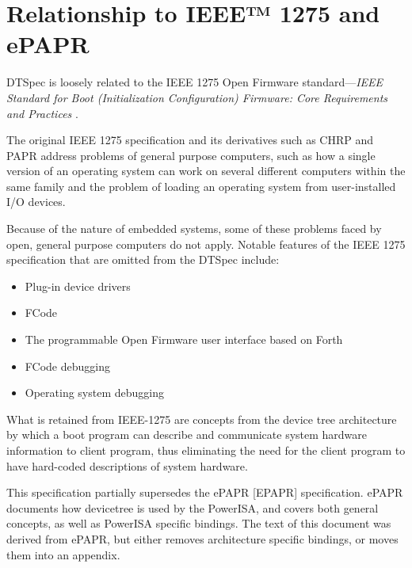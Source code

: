 \documentclass[a4paper,10pt,oneside]{sphinxmanual}
\begin{document}
\section{Relationship to IEEE™ 1275 and ePAPR}
\label{introduction:relationship-to-ieee-1275-and-epapr}
DTSpec is loosely related to the IEEE 1275 Open Firmware
standard—\emph{IEEE Standard for Boot (Initialization Configuration)
Firmware: Core Requirements and Practices} \label{introduction:id1}{\hyperref[references:ieee1275]{\crossref{{[}IEEE1275{]}}}}.

The original IEEE 1275 specification and its derivatives such as CHRP \label{introduction:id2}{\hyperref[references:chrp]{\crossref{{[}CHRP{]}}}}
and PAPR \label{introduction:id3}{\hyperref[references:papr]{\crossref{{[}PAPR{]}}}} address problems of general purpose computers, such as how a
single version of an operating system can work on several different
computers within the same family and the problem of loading an operating
system from user-installed I/O devices.

Because of the nature of embedded systems, some of these problems faced
by open, general purpose computers do not apply. Notable features of the
IEEE 1275 specification that are omitted from the DTSpec include:
\begin{itemize}
\item {} 
Plug-in device drivers

\item {} 
FCode

\item {} 
The programmable Open Firmware user interface based on Forth

\item {} 
FCode debugging

\item {} 
Operating system debugging

\end{itemize}

What is retained from IEEE-1275 are concepts from the device tree
architecture by which a boot program can describe and communicate system
hardware information to client program, thus eliminating the need for
the client program to have hard-coded descriptions of system hardware.

This specification partially supersedes the ePAPR {[}EPAPR{]} specification.
ePAPR documents how devicetree is used by the PowerISA, and covers both
general concepts, as well as PowerISA specific bindings.
The text of this document was derived from ePAPR, but either removes architecture specific bindings, or moves them into an appendix.
\end{document}
